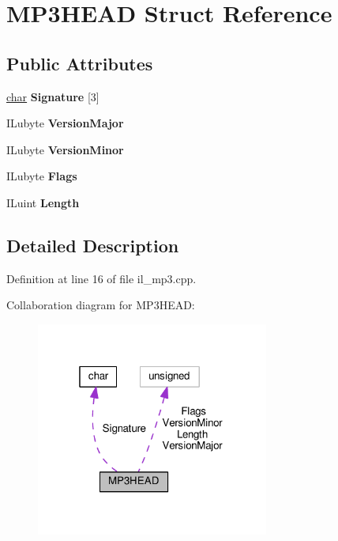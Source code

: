 \hypertarget{structMP3HEAD}{}\section{M\+P3\+H\+E\+AD Struct Reference}
\label{structMP3HEAD}
\subsection*{Public Attributes}
\begin{DoxyCompactItemize}
\item 
\mbox{\label{structMP3HEAD_a17c1f86c811ac087a8c6419572b69706}} 
\hyperlink{classchar}{char} {\bfseries Signature} \mbox{[}3\mbox{]}
\item 
\mbox{\label{structMP3HEAD_a962603cc96c11180c9f5ff8a4af6b21a}} 
I\+Lubyte {\bfseries Version\+Major}
\item 
\mbox{\label{structMP3HEAD_a223ae88dcaf585a0371671c2e0fb24e1}} 
I\+Lubyte {\bfseries Version\+Minor}
\item 
\mbox{\label{structMP3HEAD_a11a66a38a2a352c06ea053c6f54b316c}} 
I\+Lubyte {\bfseries Flags}
\item 
\mbox{\label{structMP3HEAD_a8e8a963a8d7414edffb97e49a8aa971f}} 
I\+Luint {\bfseries Length}
\end{DoxyCompactItemize}


\subsection{Detailed Description}


Definition at line 16 of file il\+\_\+mp3.\+cpp.



Collaboration diagram for M\+P3\+H\+E\+AD\+:
\nopagebreak
\begin{figure}[H]
\begin{center}
\leavevmode
\includegraphics[width=217pt]{d6/d4f/structMP3HEAD__coll__graph}
\end{center}
\end{figure}


